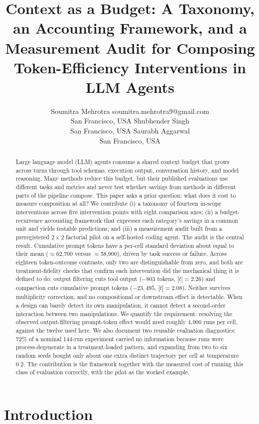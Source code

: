 \documentclass{article}
\title{Context as a Budget: A Taxonomy, an Accounting Framework, and a Measurement Audit for Composing Token-Efficiency Interventions in {LLM} Agents}
\author{%
  \name Soumitra Mehrotra \email soumitra.mehrotra9@gmail.com \\
  \addr San Francisco, USA
  \AND
  \name Shubhender Singh \\
  \addr San Francisco, USA
  \AND
  \name Saurabh Aggarwal \\
  \addr San Francisco, USA
}
\begin{document}
\maketitle

\begin{abstract}
Large language model (LLM) agents consume a shared context budget that grows across turns through tool schemas, execution output, conversation history, and model reasoning. Many methods reduce this budget, but their published evaluations use different tasks and metrics and never test whether savings from methods in different parts of the pipeline compose. This paper asks a prior question: what does it cost to measure composition at all? We contribute (i) a taxonomy of fourteen in-scope interventions across five intervention points with eight comparison axes; (ii) a budget-recurrence accounting framework that expresses each category's savings in a common unit and yields testable predictions; and (iii) a measurement audit built from a preregistered $2{\times}2$ factorial pilot on a self-hosted coding agent. The audit is the central result. Cumulative prompt tokens have a per-cell standard deviation about equal to their mean ($\approx$62{,}700 versus $\approx$58{,}900), driven by task success or failure. Across eighteen token-outcome contrasts, only two are distinguishable from zero, and both are treatment-fidelity checks that confirm each intervention did the mechanical thing it is defined to do: output filtering cuts tool output ($-803$ tokens, $|t|=2.26$) and compaction cuts cumulative prompt tokens ($-23{,}495$, $|t|=2.08$). Neither survives multiplicity correction, and no compositional or downstream effect is detectable. When a design can barely detect its own manipulation, it cannot detect a second-order interaction between two manipulations. We quantify the requirement: resolving the observed output-filtering prompt-token effect would need roughly 4{,}900 runs per cell, against the twelve used here. We also document two reusable evaluation diagnostics: 72\% of a nominal 144-run experiment carried no information because runs were process-degenerate in a treatment-loaded pattern, and expanding from two to six random seeds bought only about one extra distinct trajectory per cell at temperature 0.2. The contribution is the framework together with the measured cost of running this class of evaluation correctly, with the pilot as the worked example.
\end{abstract}

\section{Introduction}
\end{document}
